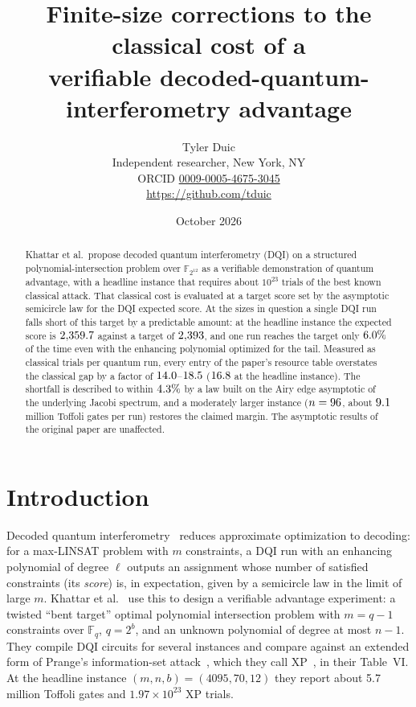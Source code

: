 \documentclass[11pt]{article}
\title{Finite-size corrections to the classical cost of a\\ verifiable decoded-quantum-interferometry advantage}
\author{Tyler Duic\\[2pt]\small Independent researcher, New York, NY\\\small ORCID \href{https://orcid.org/0009-0005-4675-3045}{0009-0005-4675-3045}\\\small\url{https://github.com/tduic}}
\date{October 2026}
\begin{document}
\maketitle

\begin{abstract}
Khattar et al.\ propose decoded quantum interferometry (DQI) on a structured polynomial-intersection problem over $\mathbb{F}_{2^{12}}$ as a verifiable demonstration of quantum advantage, with a headline instance that requires about $10^{23}$ trials of the best known classical attack.
That classical cost is evaluated at a target score set by the asymptotic semicircle law for the DQI expected score.
At the sizes in question a single DQI run falls short of this target by a predictable amount: at the headline instance the expected score is $2{,}359.7$ against a target of $2{,}393$, and one run reaches the target only $6.0\%$ of the time even with the enhancing polynomial optimized for the tail.
Measured as classical trials per quantum run, every entry of the paper's resource table overstates the classical gap by a factor of $14.0$--$18.5$ ($16.8$ at the headline instance).
The shortfall is described to within $4.3\%$ by a law built on the Airy edge asymptotic of the underlying Jacobi spectrum, and a moderately larger instance ($n=96$, about $9.1$ million Toffoli gates per run) restores the claimed margin.
The asymptotic results of the original paper are unaffected.
\end{abstract}

\section{Introduction}

Decoded quantum interferometry~\cite{jordan2025dqi} reduces approximate optimization to decoding: for a max-LINSAT problem with $m$ constraints, a DQI run with an enhancing polynomial of degree $\ell$ outputs an assignment whose number of satisfied constraints (its \emph{score}) is, in expectation, given by a semicircle law in the limit of large $m$.
Khattar et al.~\cite{khattar2025verifiable} use this to design a verifiable advantage experiment: a twisted ``bent target'' optimal polynomial intersection problem with $m=q-1$ constraints over $\mathbb{F}_q$, $q=2^b$, and an unknown polynomial of degree at most $n-1$.
They compile DQI circuits for several instances and compare against an extended form of Prange's information-set attack~\cite{prange1962}, which they call XP~\cite[Sec.~III.B]{khattar2025verifiable}, in their Table~VI.
At the headline instance $(m,n,b)=(4095,70,12)$ they report about 5.7 million Toffoli gates and $1.97\times 10^{23}$ XP trials.
\end{document}
